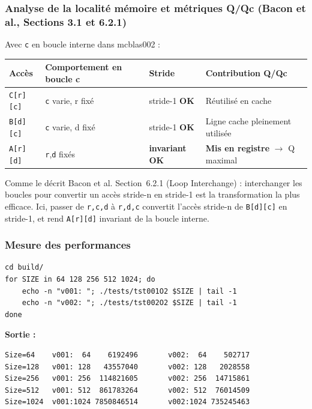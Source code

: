 \documentclass[a4paper,11pt]{article}
\newcommand{\code}[1]{\texttt{\color{CodeRed}#1}}
\newcommand{\result}[1]{\textbf{\color{GreenBorder}#1}}
\begin{document}
\subsubsection{Analyse de la localit\'e m\'emoire et m\'etriques Q/Qc (Bacon et al., Sections 3.1 et 6.2.1)}

Avec \code{c} en boucle interne dans mcblas002 :

\begin{center}
\begin{tabular}{L{2.5cm}L{4cm}C{2.5cm}L{4cm}}
  \toprule
  \textbf{Acc\`es} & \textbf{Comportement en boucle c} & \textbf{Stride} & \textbf{Contribution Q/Qc} \\
  \midrule
  \code{C[r][c]} & \code{c} varie, r fix\'e & stride-1 \result{OK} & R\'eutilis\'e en cache \\
  \code{B[d][c]} & \code{c} varie, d fix\'e & stride-1 \result{OK} & Ligne cache pleinement utilis\'ee \\
  \code{A[r][d]} & \code{r},\code{d} fix\'es & \textbf{invariant} \result{OK} & \textbf{Mis en registre} $\to$ Q maximal \\
  \bottomrule
\end{tabular}
\end{center}

Comme le d\'ecrit Bacon et al. Section~6.2.1 (Loop Interchange) : interchanger les boucles pour convertir un acc\`es stride-n en stride-1 est la transformation la plus efficace. Ici, passer de \code{r,c,d} \`a \code{r,d,c} convertit l'acc\`es stride-n de \code{B[d][c]} en stride-1, et rend \code{A[r][d]} invariant de la boucle interne.

\subsubsection{Mesure des performances}

\begin{lstlisting}[style=bash]
cd build/
for SIZE in 64 128 256 512 1024; do
    echo -n "v001: "; ./tests/tst001O2 $SIZE | tail -1
    echo -n "v002: "; ./tests/tst002O2 $SIZE | tail -1
done
\end{lstlisting}

\textbf{Sortie :}
\begin{lstlisting}[style=output]
Size=64    v001:  64    6192496       v002:  64    502717
Size=128   v001: 128   43557040       v002: 128   2028558
Size=256   v001: 256  114821605       v002: 256  14715861
Size=512   v001: 512  861783264       v002: 512  76014509
Size=1024  v001:1024 7850846514       v002:1024 735245463
\end{lstlisting}
\end{document}
